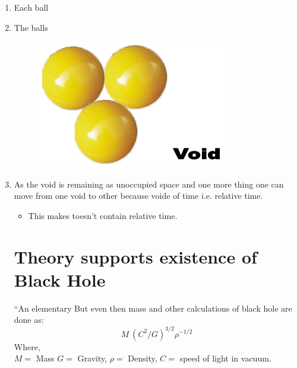 \documentclass[conference]{IEEEtran}
\begin{document}
\begin{enumerate}
\item	Each ball 
\item	The balls 
\begin{figure}[htbp]
	\centering
		\includegraphics[scale=0.5]{img2.png}
\end{figure}
\item	As the void is remaining as unoccupied space and one more thing one can move from one void to other because voide of time i.e. relative time.
\begin{itemize}
\item	This makes toesn't contain relative time.
\end{itemize}
\section{Theory supports existence of Black Hole}
``An elementary But even then mass and other calculations of black hole are done as:
$$ M^{~}(C^2/G)^{3/2}\rho^{-1/2} $$
Where,\\ $M =$ Mass
	$G =$ Gravity,
	$\rho =$ Density,
	$C =$ speed of light in vacuum.\\
	

\end{enumerate}
\end{document}
